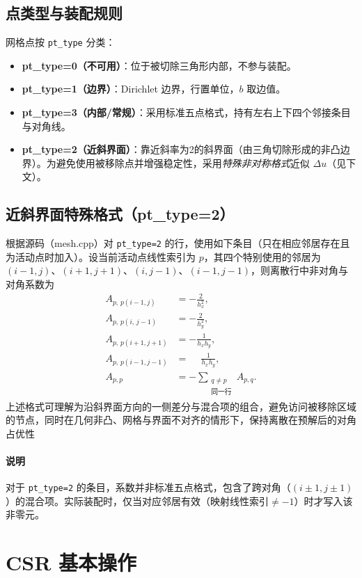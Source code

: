 \documentclass[11pt,a4paper]{article}
\begin{document}
\subsection{点类型与装配规则}
网格点按 \texttt{pt\_type} 分类：
\begin{itemize}
  \item \textbf{pt\_type=0（不可用）}：位于被切除三角形内部，不参与装配。
  \item \textbf{pt\_type=1（边界）}：Dirichlet 边界，行置单位，$b$ 取边值。
  \item \textbf{pt\_type=3（内部/常规）}：采用标准五点格式，持有左右上下四个邻接条目与对角线。
  \item \textbf{pt\_type=2（近斜界面）}：靠近斜率为2的斜界面（由三角切除形成的非凸边界）。为避免使用被移除点并增强稳定性，采用\emph{特殊非对称格式}近似 $\Delta u$（见下文）。
\end{itemize}

\subsection{近斜界面特殊格式（pt\_type=2）}
根据源码（mesh.cpp）对 \texttt{pt\_type=2} 的行，使用如下条目（只在相应邻居存在且为活动点时加入）。设当前活动点线性索引为 $p$，其四个特别使用的邻居为
$(i{-}1,j)$、$(i{+}1,j{+}1)$、$(i,j{-}1)$、$(i{-}1,j{-}1)$，则离散行中非对角与对角系数为
\[\begin{aligned}
A_{p,\,p(i-1,j)}   &= -\frac{2}{h_x^2},\\
A_{p,\,p(i,\,j-1)} &= -\frac{2}{h_y^2},\\
A_{p,\,p(i+1,j+1)} &= -\frac{1}{h_x h_y},\\
A_{p,\,p(i-1,j-1)} &= \phantom{-}\frac{1}{h_x h_y},\\
A_{p,p} &=-\!\!\!\sum_{\substack{q\neq p\\\text{同一行}}} A_{p,q}.
\end{aligned}\]
上述格式可理解为沿斜界面方向的一侧差分与混合项的组合，避免访问被移除区域的节点，同时在几何非凸、网格与界面不对齐的情形下，保持离散在预解后的对角占优性

\paragraph{说明} 对于 \texttt{pt\_type=2} 的条目，系数并非标准五点格式，包含了跨对角（$(i\pm1,j\pm1)$）的混合项。实际装配时，仅当对应邻居有效（映射线性索引$\neq -1$）时才写入该非零元。

\section{CSR 基本操作}
\end{document}
